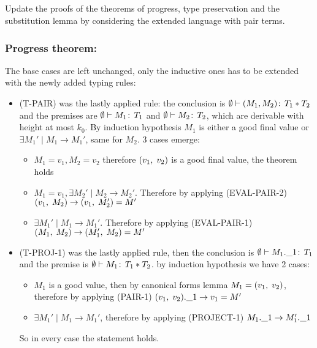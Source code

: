 \subsection{}
Update the proofs of the theorems of progress, type preservation and the substitution lemma by
considering the extended language with pair terms.

\subsubsection*{Progress theorem:}

The base cases are left unchanged, only the inductive ones has to be extended with the newly
added typing rules:
\begin{itemize}
\item (T-PAIR) was the lastly applied rule: the conclusion is
  \(\emptyset \vdash (M_1, M_2) \!:\,T_1 * T_2\) and the premises
  are \(\emptyset \vdash M_1 \!:\,T_1\) and \(\emptyset \vdash M_2
  \!:\,T_2\), which are derivable with height at most \(k_0\). By
  induction hypothesis \(M_1\) is either a good final value or
  \(\exists M_1' \mid M_1 \to M_1'\), same for \(M_2\). 3 cases
  emerge:
  \begin{itemize}
    \item \(M_1 = v_1, M_2 = v_2\) therefore \((v_1,\;v_2)\) is a
      good final value, the theorem holds
    \item \(M_1 = v_1, \exists M_2'\mid M_2 \to M_2'\). Therefore by
      applying (EVAL-PAIR-2) \((v_1,\;M_2) \to (v_1,\;M_2') =
      M'\)
    \item \(\exists M_1'\mid M_1 \to M_1'\). Therefore by applying
      (EVAL-PAIR-1) \((M_1,\;M_2) \to (M_1',\;M_2) = M'\)
  \end{itemize}
\item (T-PROJ-1) was the lastly applied rule, then the conclusion is
  \(\emptyset \vdash M_1.\_1 \!:\,T_1\) and the premise is
  \(\emptyset \vdash M_1 \!:\,T_1 * T_2\). by induction hypothesis
  we have 2 cases:
  \begin{itemize}
  \item \(M_1\) is a good value, then by canonical forms lemma \(M_1 =
    (v_1,\;v_2)\), therefore by applying (PAIR-1)
    \((v_1,\;v_2).\_1 \to v_1 = M'\)
  \item \(\exists M_1' \mid M_1 \to M_1'\), therefore by applying
    (PROJECT-1) \(M_1.\_1 \to M_1'.\_1\)
  \end{itemize}
  So in every case the statement holds.
\end{itemize}

